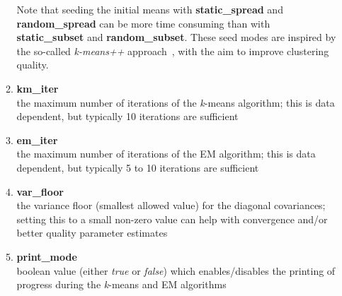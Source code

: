 \begin{small}
\begin{itemize}
\begin{enumerate}[{$\cdot$}]
Note that seeding the initial means with {\bf static\_spread} and {\bf random\_spread}
can be more time consuming than with {\bf static\_subset} and {\bf random\_subset}.
These seed modes are inspired by the so-called {\it k-means++} approach~\cite{Arthur_2007}, with the aim to improve clustering quality.

\item
{\bf km\_iter}\\
the maximum number of iterations of the {\it k}-means algorithm; this is data dependent, but typically 10 iterations are sufficient

\item
{\bf em\_iter}\\
the maximum number of iterations of the EM algorithm; this is data dependent, but typically 5 to 10 iterations are sufficient

\item
{\bf var\_floor}\\
the variance floor (smallest allowed value) for the diagonal covariances; setting this to a small non-zero value can help with convergence and/or better quality parameter estimates

\item
{\bf print\_mode}\\
boolean value (either {\it true} or {\it false}) which enables/disables the printing of progress during the {\it k}-means and EM algorithms 

\end{enumerate}


\end{itemize}
\end{small}



